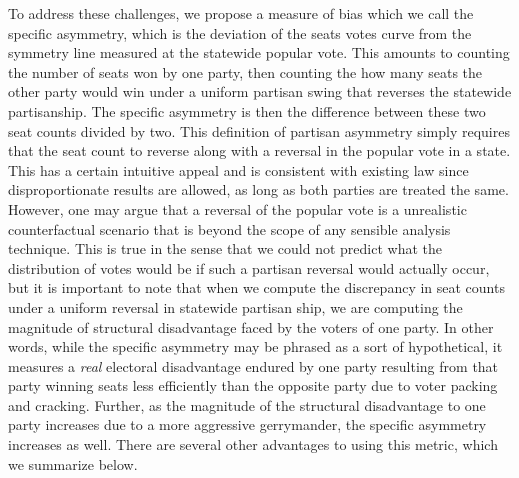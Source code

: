 \documentclass[preprint,12pt]{article}
\begin{document}
To address these challenges, we propose a measure of bias which we call the specific asymmetry, which is the deviation of the seats votes curve from the symmetry line measured at the statewide popular vote.
This amounts to counting the number of seats won by one party, then counting the how many seats the other party would win under a uniform partisan swing that reverses the statewide partisanship.
The specific asymmetry is then the difference between these two seat counts divided by two.
This definition of partisan asymmetry simply requires that the seat count to reverse along with a reversal in the popular vote in a state.
This has a certain intuitive appeal and is consistent with existing law since disproportionate results are allowed, as long as both parties are treated the same.
However, one may argue that a reversal of the popular vote is a unrealistic counterfactual scenario that is beyond the scope of any sensible analysis technique.
This is true in the sense that we could not predict what the distribution of votes would be if such a partisan reversal would actually occur, but it is important to note that when we compute the discrepancy in seat counts under a uniform reversal in statewide partisan ship, we are computing the magnitude of structural disadvantage faced by the voters of one party.
In other words, while the specific asymmetry may be phrased as a sort of hypothetical, it measures a \emph{real} electoral disadvantage endured by one party resulting from that party winning seats less efficiently than the opposite party due to voter packing and cracking.
Further, as the magnitude of the structural disadvantage to one party increases due to a more aggressive gerrymander, the specific asymmetry increases as well.
There are several other advantages to using this metric, which we summarize below.
\end{document}
